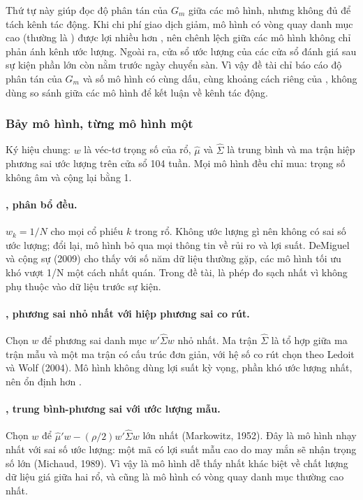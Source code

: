Thứ tự này giúp đọc độ phân tán của $G_m$ giữa các mô hình, nhưng không đủ để tách kênh tác động. Khi chi phí giao dịch giảm, mô hình có vòng quay danh mục cao (thường là ) được lợi nhiều hơn , nên chênh lệch giữa các mô hình không chỉ phản ánh kênh ước lượng. Ngoài ra, cửa sổ ước lượng của các cửa sổ đánh giá sau sự kiện phần lớn còn nằm trước ngày chuyển sàn. Vì vậy đề tài chỉ báo cáo độ phân tán của $G_m$ và số mô hình có cùng dấu, cùng khoảng cách riêng của , không dùng so sánh giữa các mô hình để kết luận về kênh tác động.

\subsubsection*{Bảy mô hình, từng mô hình một}

Ký hiệu chung: $w$ là véc-tơ trọng số của rổ, $\hat{\mu}$ và $\hat{\Sigma}$ là trung bình và ma trận hiệp phương sai ước lượng trên cửa sổ 104 tuần. Mọi mô hình đều chỉ mua: trọng số không âm và cộng lại bằng 1.

\paragraph{, phân bổ đều.} $w_k = 1/N$ cho mọi cổ phiếu $k$ trong rổ. Không ước lượng gì nên không có sai số ước lượng; đổi lại, mô hình bỏ qua mọi thông tin về rủi ro và lợi suất. DeMiguel và cộng sự (2009) cho thấy với số năm dữ liệu thường gặp, các mô hình tối ưu khó vượt 1/N một cách nhất quán. Trong đề tài,  là phép đo sạch nhất vì không phụ thuộc vào dữ liệu trước sự kiện.

\paragraph{, phương sai nhỏ nhất với hiệp phương sai co rút.} Chọn $w$ để phương sai danh mục $w'\hat{\Sigma}w$ nhỏ nhất. Ma trận $\hat{\Sigma}$ là tổ hợp giữa ma trận mẫu và một ma trận có cấu trúc đơn giản, với hệ số co rút chọn theo Ledoit và Wolf (2004). Mô hình không dùng lợi suất kỳ vọng, phần khó ước lượng nhất, nên ổn định hơn .

\paragraph{, trung bình-phương sai với ước lượng mẫu.} Chọn $w$ để $\hat{\mu}'w - (\rho/2)w'\hat{\Sigma}w$ lớn nhất (Markowitz, 1952). Đây là mô hình nhạy nhất với sai số ước lượng: một mã có lợi suất mẫu cao do may mắn sẽ nhận trọng số lớn (Michaud, 1989). Vì vậy  là mô hình dễ thấy nhất khác biệt về chất lượng dữ liệu giá giữa hai rổ, và cũng là mô hình có vòng quay danh mục thường cao nhất.

